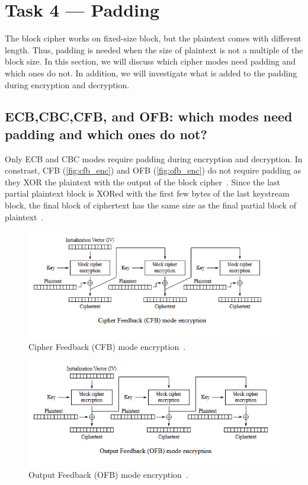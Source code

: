 \section{Task 4 --- Padding}
%
The block cipher works on fixed-size block, but the plaintext comes with
different length. Thus, padding is needed when the size of plaintext is not a
multiple of the block size. In this section, we will discuss which cipher
modes need padding and which ones do not. In addition, we will investigate
what is added to the padding during encryption and decryption.

\subsection{ECB,CBC,CFB, and OFB: which modes need padding and which ones do not?}
%
Only ECB and CBC modes require padding during encryption and decryption.
In constrast, CFB (\autoref{fig:cfb_enc}) and OFB (\autoref{fig:ofb_enc}) do not require
padding as they XOR the plaintext with the output of the block cipher~\cite{cipher_mode_wiki}.
Since the last partial plaintext block is XORed with the first few bytes of the last
keystream block, the final block of ciphertext has the same size as the final partial
block of plaintext~\cite{cipher_mode_wiki}.

\begin{figure}
    \centering
    \includegraphics[height=\textheight,width=\textwidth,keepaspectratio]
    {figures/CFB_encryption.png}
    \caption{Cipher Feedback (CFB) mode encryption~\cite{cipher_mode_wiki}.}\label{fig:cfb_enc}
\end{figure}

\begin{figure}
    \centering
    \includegraphics[height=\textheight,width=\textwidth,keepaspectratio]
    {figures/OFB_encryption.png}
    \caption{Output Feedback (OFB) mode encryption~\cite{cipher_mode_wiki}.}\label{fig:ofb_enc}
\end{figure}

